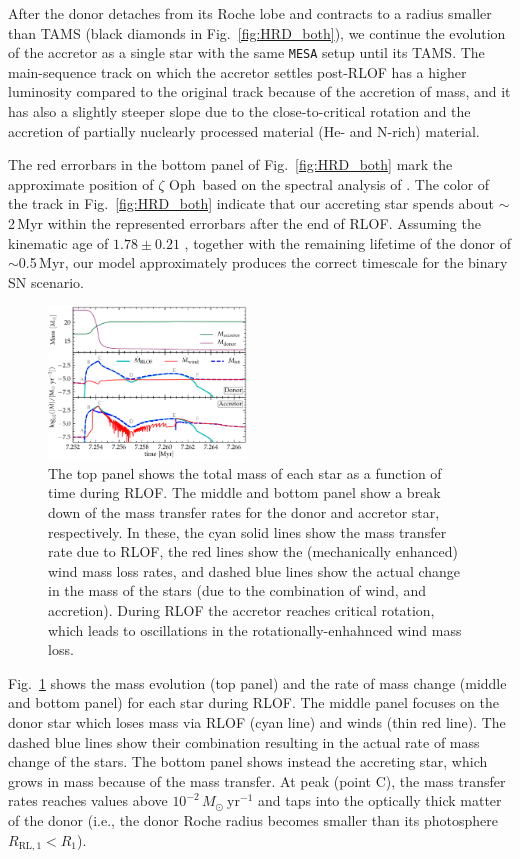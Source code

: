 \documentclass[twocolumn,twocolappendix,trackchanges]{aastex63}
\DeclareRobustCommand{\Figref}[1]{Fig.~\ref{#1}}
\newcommand{\zoph}{$\zeta$ Oph}
\begin{document}
After the donor detaches from its Roche lobe and contracts to a radius smaller than TAMS (black diamonds in \Figref{fig:HRD_both}), we continue the evolution of the accretor as a single star with the same \texttt{MESA} setup until its TAMS. The main-sequence track on which the accretor settles post-RLOF has a higher luminosity compared to the original track because of the accretion of mass, and it has also a slightly steeper slope due to the close-to-critical rotation and the accretion of partially nuclearly processed material (He- and N-rich) material.

The red errorbars in the bottom panel of \Figref{fig:HRD_both} mark
the approximate position of \zoph\ based on the spectral analysis of
. The color of the track in
\Figref{fig:HRD_both} indicate that our accreting star spends about
$\sim$2\,Myr within the represented errorbars after the end of
RLOF. Assuming the kinematic age of $1.78\pm0.21$
\citep{neuhauser:20}, together with the remaining lifetime of the
donor of $\sim$0.5\,Myr, our model approximately produces the correct
timescale for the binary SN scenario.



\begin{figure}[htbp]
  \includegraphics[width=0.47\textwidth]{MT}
  \caption{The top panel shows the total mass of each star as a
    function of time during RLOF. The middle and bottom panel show a break down of
    the mass transfer rates for the donor and accretor star,
    respectively. In these, the cyan solid lines show the mass transfer rate
    due to RLOF, the red lines show the (mechanically
    enhanced) wind mass loss rates, and dashed blue lines show the actual
    change in the mass of the stars (due to the combination of wind,
    and accretion). During RLOF the accretor reaches
    critical rotation, which leads to oscillations in the
    rotationally-enhahnced wind mass loss.}
  \label{fig:MT}
\end{figure}

\Figref{fig:MT} shows the mass evolution (top panel) and the rate of
mass change (middle and bottom panel) for each star during
RLOF. The middle panel focuses on the donor star which loses mass via RLOF
(cyan line) and winds (thin red line). The dashed blue lines
show their combination resulting in the actual rate of mass change of
the stars. The bottom panel shows instead the accreting star, which
grows in mass because of the mass transfer. At peak (point C), the mass transfer
rates reaches values above
$10^{-2}\,M_\odot\ \mathrm{yr^{-1}}$ and taps into the optically
thick matter of the donor (i.e., the donor Roche radius becomes
smaller than its photosphere $R_\mathrm{RL,1}<R_1$).
\end{document}
